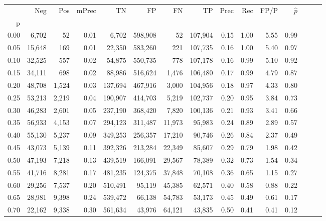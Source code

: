 \begin{tabular}{rrrrrrrrrrrrrrr}
\toprule
{} &     Neg &    Pos & mPrec &       TN &       FP &       FN &       TP &  Prec &   Rec &  FP/P & $\hat{p}$ \\
p    &         &        &       &          &          &          &          &       &       &       &           \\
\midrule
0.00 &   6,702 &     52 &  0.01 &    6,702 &  598,908 &       52 &  107,904 &  0.15 &  1.00 &  5.55 &      0.99 \\
0.05 &  15,648 &    169 &  0.01 &   22,350 &  583,260 &      221 &  107,735 &  0.16 &  1.00 &  5.40 &      0.97 \\
0.10 &  32,525 &    557 &  0.02 &   54,875 &  550,735 &      778 &  107,178 &  0.16 &  0.99 &  5.10 &      0.92 \\
0.15 &  34,111 &    698 &  0.02 &   88,986 &  516,624 &    1,476 &  106,480 &  0.17 &  0.99 &  4.79 &      0.87 \\
0.20 &  48,708 &  1,524 &  0.03 &  137,694 &  467,916 &    3,000 &  104,956 &  0.18 &  0.97 &  4.33 &      0.80 \\
0.25 &  53,213 &  2,219 &  0.04 &  190,907 &  414,703 &    5,219 &  102,737 &  0.20 &  0.95 &  3.84 &      0.73 \\
0.30 &  46,283 &  2,601 &  0.05 &  237,190 &  368,420 &    7,820 &  100,136 &  0.21 &  0.93 &  3.41 &      0.66 \\
0.35 &  56,933 &  4,153 &  0.07 &  294,123 &  311,487 &   11,973 &   95,983 &  0.24 &  0.89 &  2.89 &      0.57 \\
0.40 &  55,130 &  5,237 &  0.09 &  349,253 &  256,357 &   17,210 &   90,746 &  0.26 &  0.84 &  2.37 &      0.49 \\
0.45 &  43,073 &  5,139 &  0.11 &  392,326 &  213,284 &   22,349 &   85,607 &  0.29 &  0.79 &  1.98 &      0.42 \\
0.50 &  47,193 &  7,218 &  0.13 &  439,519 &  166,091 &   29,567 &   78,389 &  0.32 &  0.73 &  1.54 &      0.34 \\
0.55 &  41,716 &  8,281 &  0.17 &  481,235 &  124,375 &   37,848 &   70,108 &  0.36 &  0.65 &  1.15 &      0.27 \\
0.60 &  29,256 &  7,537 &  0.20 &  510,491 &   95,119 &   45,385 &   62,571 &  0.40 &  0.58 &  0.88 &      0.22 \\
0.65 &  28,981 &  9,398 &  0.24 &  539,472 &   66,138 &   54,783 &   53,173 &  0.45 &  0.49 &  0.61 &      0.17 \\
0.70 &  22,162 &  9,338 &  0.30 &  561,634 &   43,976 &   64,121 &   43,835 &  0.50 &  0.41 &  0.41 &      0.12 \\

\end{tabular}
